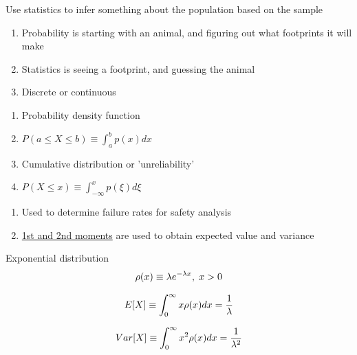 \documentclass[aspectratio=1610,pdftex,dvipsnames,compress,xcolor={dvipsnames}]{beamer}
\begin{document}
\addtocounter{framenumber}{-1}
\begin{frame}{Use statistics to infer something about the population based on the sample}
    \begin{enumerate}[series=outerlist,topsep=0pt,itemsep=3pt,leftmargin=*,label=(\arabic*)]
        \item[]Probability is starting with an animal, and figuring out what footprints it will make
        \item[]Statistics is seeing a footprint, and guessing the animal
        \item[]Discrete or continuous
    \end{enumerate}

    \vspace{0.25in}

    \begin{enumerate}[series=outerlist,topsep=0pt,itemsep=3pt,leftmargin=*,label=(\arabic*)]
        \item[]Probability density function  
        \item[]$P(a \leq X \leq b) \equiv \int_a^b p(x)dx$
            \vspace{0.15in}
        \item[]Cumulative distribution or 'unreliability'
        \item[]$P(X \leq x) \equiv \int_{-\infty}^x p(\xi)d\xi$
    \end{enumerate}

    \vspace{0.25in}

    \begin{enumerate}[series=outerlist,topsep=0pt,itemsep=3pt,leftmargin=*,label=(\arabic*)]
        \item[]Used to determine failure rates for safety analysis  
        \item[]\href{https://uidaho.pressbooks.pub/riskassessment/chapter/statistical-moments/}{1st and 2nd moments} are used to obtain expected value and variance
    \end{enumerate}
\end{frame}


\begin{frame}{Exponential distribution}
    \begin{equation}
        \LARGE
        \rho (x) \equiv \lambda e^{-\lambda x}, \; x > 0
    \end{equation}

    \begin{equation}
        \LARGE
        E[X] \equiv \int_{0}^{\infty} x \rho (x) dx = \frac{1}{\lambda}
    \end{equation}

    \begin{equation}
        \LARGE
        Var[X] \equiv \int_{0}^{\infty} x^2 \rho (x) dx = \frac{1}{\lambda^2}
    \end{equation}
\end{frame}
\end{document}
